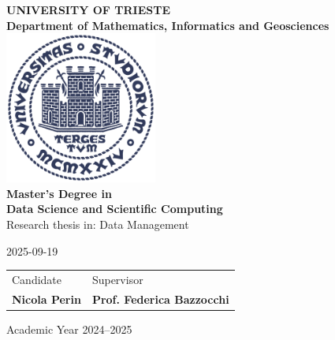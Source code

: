 \begin{titlepage}
	\begin{center}
		{\LARGE {\bfseries UNIVERSITY OF TRIESTE \\}}
		{\Large {\bfseries Department of Mathematics, Informatics and Geosciences\\}}
		\vspace{1cm}
		\includegraphics[width=5cm,height=5cm]{img/units_logo.png}\\[1cm]
		
		\vfill
		{\Large \bfseries Master's Degree in\\}
		{\LARGE \bfseries Data Science and Scientific Computing \\}
		{\Large Research thesis in: Data Management \\}
		\vspace{1cm}
		
		{\huge \bfseries \thetitle}
		\vspace{1cm}
		
		{\large 2025-09-19 \\[1cm]}
		
		{\Large
			\setlength{\tabcolsep}{32pt}
			\begin{tabularx}{\linewidth}{ >{\raggedleft}X >{\raggedright\arraybackslash}X}
				Candidate & Supervisor \\
				\bfseries Nicola Perin & \bfseries Prof. Federica Bazzocchi\\ [5mm]
			\end{tabularx}
		}
		
		\vfill
		{\Large Academic Year 2024--2025}
	\end{center}
\end{titlepage}

\ClearShipoutPicture
\newgeometry{}
